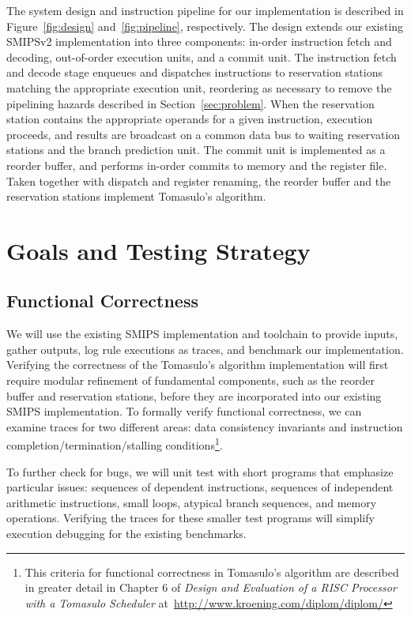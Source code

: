 \documentclass[12pt]{article}
\begin{document}
The system design and instruction pipeline for our implementation is described
in Figure~\ref{fig:design} and~\ref{fig:pipeline}, respectively. 
The design extends our existing SMIPSv2 
implementation into three components: in-order instruction fetch and decoding, 
out-of-order execution units, and a commit unit. The instruction fetch and 
decode stage enqueues and dispatches instructions to reservation stations 
matching the appropriate execution unit, reordering as necessary to remove the 
pipelining hazards described in Section~\ref{sec:problem}. When the reservation 
station contains the appropriate operands for a given instruction, execution 
proceeds, and results are broadcast on a common data bus to waiting reservation 
stations and the branch prediction unit. The commit unit is implemented as a 
reorder buffer, and performs in-order commits to memory and the register file. 
Taken together with dispatch and register renaming, the reorder buffer and the 
reservation stations implement Tomasulo's algorithm.   

\section{Goals and Testing Strategy}

\subsection{Functional Correctness}

We will use the existing SMIPS implementation and toolchain to provide inputs, gather 
outputs, log rule executions as traces, and benchmark our implementation. Verifying the 
correctness of the Tomasulo's algorithm implementation will first require modular refinement
of fundamental components, such as the reorder buffer and reservation stations, before 
they are incorporated into our existing SMIPS implementation. To formally verify functional correctness,
we can examine traces for two different areas: data consistency invariants and instruction 
completion/termination/stalling conditions\footnote{This criteria for functional correctness in Tomasulo's
algorithm are described in greater detail in Chapter 6 of 
\emph{Design and Evaluation of a RISC Processor with a Tomasulo Scheduler} at~\url{http://www.kroening.com/diplom/diplom/}}.  

To further check for bugs, we will unit test with short programs that 
emphasize particular issues: sequences of dependent instructions, sequences of independent
arithmetic instructions, small loops, atypical branch sequences, and memory operations. 
Verifying the traces for these smaller test programs will simplify execution debugging 
for the existing benchmarks.
\end{document}
